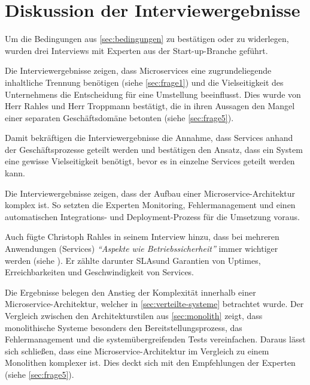 \section{Diskussion der Interviewergebnisse}
\label{sec:auswertung}

Um die Bedingungen aus \cref{sec:bedingungen} zu bestätigen oder zu widerlegen, wurden drei Interviews mit Experten aus der Start-up-Branche geführt.

Die Interviewergebnisse zeigen, dass Microservices eine zugrundeliegende inhaltliche Trennung benötigen (siehe \cref{sec:frage1}) und die Vielseitigkeit des Unternehmens die Entscheidung für eine Umstellung beeinflusst. Dies wurde von Herr Rahles und Herr Troppmann bestätigt, die in ihren Aussagen den Mangel einer separaten Geschäftsdomäne betonten (siehe \cref{sec:frage5}).

\label{sec:vielseitigkeit}
Damit bekräftigen die Interviewergebnisse die Annahme, dass Services anhand der Geschäftsprozesse geteilt werden und bestätigen den Ansatz, dass ein System eine gewisse Vielseitigkeit benötigt, bevor es in einzelne Services geteilt werden kann.

Die Interviewergebnisse zeigen, dass der Aufbau einer Microservice-Architektur komplex ist. So setzten die Experten Monitoring, Fehlermanagement und einen automatischen Integrations- und Deployment-Prozess für die Umsetzung voraus.


Auch fügte Christoph Rahles in seinem Interview hinzu, dass bei mehreren Anwendungen (Services) \textit{\enquote{Aspekte wie Betriebssicherheit}} immer wichtiger werden (siehe ). Er zählte darunter SLAs\footnotemark und Garantien von Uptimes, Erreichbarkeiten und Geschwindigkeit von Services.


Die Ergebnisse belegen den Anstieg der Komplexität innerhalb einer Microservice-Architektur, welcher in \cref{sec:verteilte-systeme} betrachtet wurde. Der Vergleich zwischen den Architekturstilen aus \cref{sec:monolith} zeigt, dass monolithische Systeme besonders den Bereitstellungsprozess, das Fehlermanagement und die systemübergreifenden Tests vereinfachen. Daraus lässt sich schließen, dass eine Microservice-Architektur im Vergleich zu einem Monolithen komplexer ist. Dies deckt sich mit den Empfehlungen der Experten (siehe \cref{sec:frage5}).

